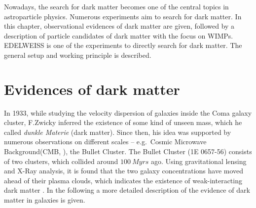 
Nowadays, the search for dark matter becomes one of the central topics in astroparticle physics.  Numerous experiments aim to search for dark matter. In this chapter, observational evidences of dark matter are given, followed by a description of particle candidates of dark matter with the focus on WIMPs. EDELWEISS is one of the experiments to directly search for dark matter. The general setup and working principle is described.

\section{Evidences of dark matter}
In 1933, while studying the velocity dispersion of galaxies inside the Coma galaxy cluster, F.Zwicky inferred the existence of some kind of unseen mass, which he called \textit{dunkle Materie} (dark matter). Since then, his idea was supported by numerous observations on different scales -- e.g.\ Cosmic Microwave Background(CMB, \cite{Pla16}), the Bullet Cluster.
The Bullet Cluster (1E 0657-56) consists of two clusters, which collided around $\SI{100}{Myrs}$ ago. Using gravitational lensing and X-Ray analysis, it is found that the two galaxy concentrations have moved ahead of their plasma clouds, which indicates the existence of weak-interacting dark matter \cite{Clo06}.
In the following a more detailed description of the evidence of dark matter in galaxies is given.
